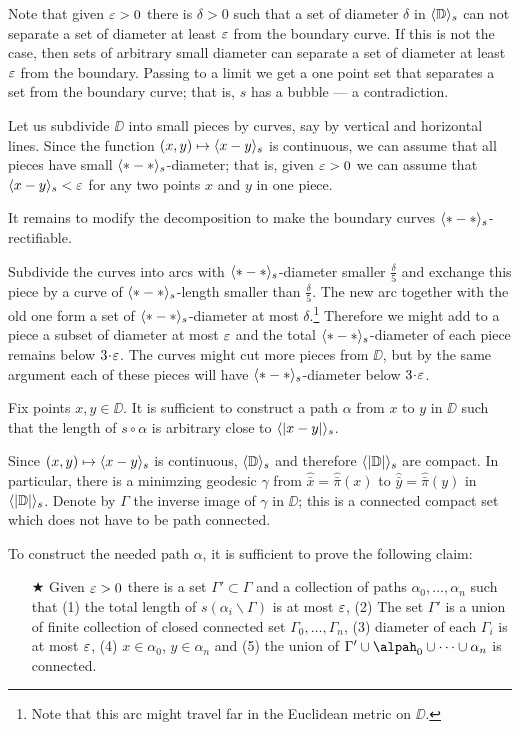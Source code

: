 Note that given $\varepsilon>0$ there is $\delta>0$ such that a set of diameter $\delta$ in $\langle\mathbb{D}\rangle_s$ can not separate a set of diameter at least $\varepsilon$ from the boundary curve.
If this is not the case, 
then sets of arbitrary small diameter can separate a set of diameter at least $\varepsilon$ from the boundary.
Passing to a limit we get a one point set that separates a set from the boundary curve; that is, $s$ has a bubble --- a contradiction. 

Let us subdivide $\DD$ into small pieces by curves, say by vertical and horizontal lines.
Since the function $(x,y)\mapsto \langle x-y\rangle_s$ is continuous,
we can assume that all pieces have small $\langle{*}-{*}\rangle_s$-diameter;
that is, given $\varepsilon>0$ we can assume that $\langle x-y\rangle_s<\varepsilon$ for any two points $x$ and $y$ in one piece.

It remains to modify the decomposition to make the boundary curves $\langle{*}-{*}\rangle_s$-rectifiable.

Subdivide the curves into arcs with $\langle{*}-{*}\rangle_s$-diameter smaller $\tfrac{\delta}{5}$ and exchange this piece by a curve of $\langle{*}-{*}\rangle_s$-length smaller than $\tfrac{\delta}{5}$.
The new arc together with the old one form a set of  $\langle{*}-{*}\rangle_s$-diameter at most $\delta$.\footnote{Note that this arc might travel far in the Euclidean metric on $\DD$.}
Therefore we might add to a piece a subset of diameter at most $\varepsilon$ and the total $\langle{*}-{*}\rangle_s$-diameter of each piece remains below $3\cdot\eps$.
The curves might cut more pieces from $\DD$, but by the same argument each of these pieces will have $\langle{*}-{*}\rangle_s$-diameter below $3\cdot\eps$.
\qeds

Fix points $x,y\in \DD$.
It is sufficient to construct a path $\alpha$ from $x$ to $y$ in $\DD$ such that the length of $s\circ\alpha$ is arbitrary close to $\langle|x-y|\rangle_s$.

Since $(x,y)\mapsto \langle x-y\rangle_s$ is continuous, $\langle\mathbb{D}\rangle_s$ and therefore $\langle|\mathbb{D}|\rangle_s$ are compact.
In particular, there is a minimzing geodesic $\gamma$ from $\hat{\bar x}=\hat{\bar \pi}(x)$ to $\hat{\bar y}=\hat{\bar \pi}(y)$ in $\langle|\mathbb{D}|\rangle_s$.
Denote by $\Gamma$ the inverse image of $\gamma$ in $\DD$;
this is a connected compact set which does not have to be path connected.

To construct the needed path $\alpha$, it is sufficient to prove the following claim:

\begin{itemize}
 \item[$\bigstar$] Given $\varepsilon>0$ there is a set $\Gamma'\subset \Gamma$ 
 and a collection of paths $\alpha_0,\dots,\alpha_n$ such that 
 (1) the total length of $s(\alpha_i\backslash\Gamma)$ is at most $\varepsilon$, 
 (2) The set $\Gamma'$ is a union of finite collection of closed connected set $\Gamma_0,\dots,\Gamma_n$, 
 (3) diameter of each $\Gamma_i$ is at most $\varepsilon$, 
 (4) $x\in\alpha_0$, $y\in\alpha_n$ and 
 (5) the union of $\Gamma'\cup \alpah_0\cup\dots\cup\alpha_n$ is connected.
\end{itemize}

